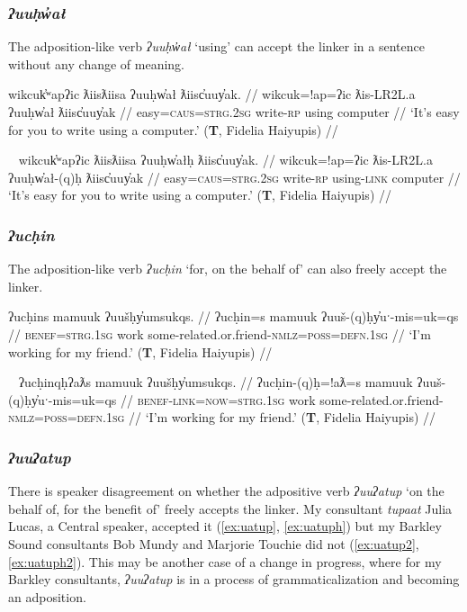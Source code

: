 \subsubsection{\textit{ʔuuḥw̓ał}} \label{ch:link:uuhwal} The adposition-like verb \textit{ʔuuḥw̓ał} `using' can accept the linker in a sentence without any change of meaning.

\ex \label{ex:uuhwal}
\begingl
\glpreamble wikcuk̓ʷapʔic ƛiisƛiisa ʔuuḥw̓ał ƛiisc̓uuy̓ak. //
\gla wikcuk=!ap=ʔic ƛis-LR2L.a ʔuuḥw̓ał ƛiisc̓uuy̓ak //
\glb easy=\textsc{caus}=\textsc{strg.2sg} write-\textsc{rp} using computer //
\glft `It's easy for you to write using a computer.' (\textbf{T}, Fidelia Haiyupis) //
\endgl
\xe

\ex~ \label{ex:uuhwalh}
\begingl
\glpreamble wikcuk̓ʷapʔic ƛiisƛiisa ʔuuḥw̓ałḥ ƛiisc̓uuy̓ak. //
\gla wikcuk=!ap=ʔic ƛis-LR2L.a ʔuuḥw̓ał-(q)ḥ ƛiisc̓uuy̓ak //
\glb easy=\textsc{caus}=\textsc{strg.2sg} write-\textsc{rp} using-\textsc{link} computer //
\glft `It's easy for you to write using a computer.' (\textbf{T}, Fidelia Haiyupis) //
\endgl
\xe

\subsubsection{\textit{ʔucḥin}} \label{ch:link:uuchin} The adposition-like verb \textit{ʔucḥin} `for, on the behalf of' can also freely accept the linker. %

\ex \label{ex:uuchin}
\begingl
\glpreamble ʔucḥins mamuuk ʔuušḥy̓umsukqs. //
\gla ʔucḥin=s mamuuk ʔuuš-(q)ḥy̓uˑ-mis=uk=qs //
\glb \textsc{benef}=\textsc{strg.1sg} work some-related.or.friend-\textsc{nmlz}=\textsc{poss}=\textsc{defn.1sg} //
\glft `I'm working for my friend.' (\textbf{T}, Fidelia Haiyupis) //
\endgl
\xe

\ex~ \label{ex:uuchinqh}
\begingl
\glpreamble ʔucḥinqḥʔaƛs mamuuk ʔuušḥy̓umsukqs. //
\gla ʔucḥin-(q)ḥ=!aƛ=s mamuuk ʔuuš-(q)ḥy̓uˑ-mis=uk=qs //
\glb \textsc{benef}-\textsc{link}=\textsc{now}=\textsc{strg.1sg} work some-related.or.friend-\textsc{nmlz}=\textsc{poss}=\textsc{defn.1sg} //
\glft `I'm working for my friend.' (\textbf{T}, Fidelia Haiyupis) //
\endgl
\xe

\subsubsection{\textit{ʔuuʔatup}} \label{ch:link:uatup} There is speaker disagreement on whether the adpositive verb \textit{ʔuuʔatup} `on the behalf of, for the benefit of' freely accepts the linker. My consultant \textit{tupaat} Julia Lucas, a Central speaker, accepted it (\ref{ex:uatup}, \ref{ex:uatuph}) but my Barkley Sound consultants Bob Mundy and Marjorie Touchie did not (\ref{ex:uatup2}, \ref{ex:uatuph2}). This may be another case of a change in progress, where for my Barkley consultants, \textit{ʔuuʔatup} is in a process of grammaticalization and becoming an adposition.

